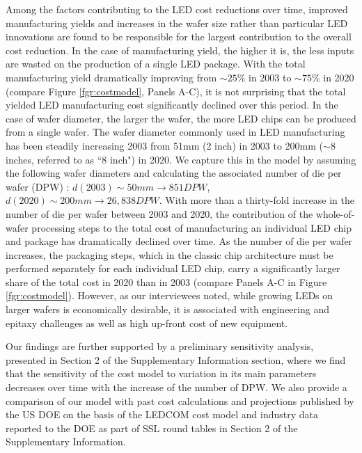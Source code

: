 \documentclass[journal=jacsat,manuscript=article]{achemso}
\begin{document}
Among the factors contributing to the LED cost reductions over time, improved manufacturing yields and increases in the wafer size rather than particular LED innovations are found to be responsible for the largest contribution to the overall cost reduction. In the case of manufacturing yield, the higher it is, the less inputs are wasted on the production of a single LED package. With the total manufacturing yield dramatically improving from $\sim25\%$ in 2003 to $\sim75\%$ in 2020 (compare Figure \ref{fgr:costmodel}, Panels A-C), it is not surprising that the total yielded LED manufacturing cost significantly declined over this period. In the case of wafer diameter, the larger the wafer, the more LED chips can be produced from a single wafer. The wafer diameter commonly used in LED manufacturing has been steadily increasing 2003 from 51mm (2 inch) in 2003 to 200mm ($\sim$8 inches, referred to as “8 inch") in 2020. We capture this in the model by assuming the following wafer diameters and calculating the associated number of die per wafer (DPW) \cite{de2005investigation}: $d(2003)\sim 50 mm \rightarrow851 DPW$, $d(2020)\sim200 mm \rightarrow 26,838 DPW$. With more than a thirty-fold increase in the number of die per wafer between 2003 and 2020, the contribution of the whole-of-wafer processing steps to the total cost of manufacturing an individual LED chip and package has dramatically declined over time. As the number of die per wafer increases, the packaging steps, which in the classic chip architecture must be performed separately for each individual LED chip, carry a significantly larger share of the total cost in 2020 than in 2003 (compare Panels A-C in Figure \ref{fgr:costmodel}). However, as our interviewees noted, while growing LEDs on larger wafers is economically desirable, it is associated with engineering and epitaxy challenges as well as high up-front cost of new equipment.

Our findings are further supported by a preliminary sensitivity analysis, presented in Section 2 of the Supplementary Information section, where we find that the sensitivity of the cost model to variation in its main parameters decreases over time with the increase of the number of DPW. We also provide a comparison of our model with past cost calculations and projections published by the US DOE on the basis of the LEDCOM cost model\cite{ledcomv2} and industry data reported to the DOE as part of SSL round tables\cite{doe2010solid}\cite{doe2011solid}\cite{doe2012solid}\cite{doe2013solid}\cite{doe2014solid}\cite{doe2015solid}\cite{doe2016solid} in Section 2 of the Supplementary Information.
\end{document}
